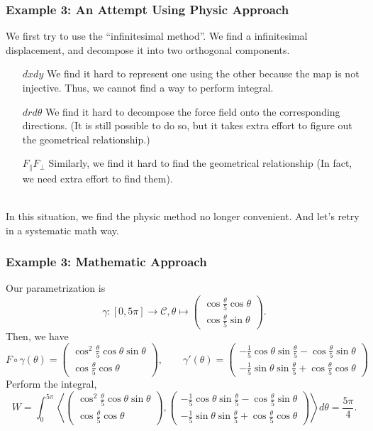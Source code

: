 \documentclass[11pt, t]{beamer}
\newcommand{\nullspace}{~\\[15pt]}
\begin{document}
\begin{frame}
    \frametitle{Example 3: An Attempt Using Physic Approach}
    We first try to use the ``infinitesimal method''. We find a infinitesimal displacement, and decompose it into two orthogonal components.  \nullspace
    \begin{itemize}
        \item[$dxdy$] We find it hard to represent one using the other because the map is not injective. Thus, we cannot  find a way to perform integral.
        \item[$drd\theta$] We find it hard to decompose the force field onto the corresponding directions. (It is still possible to do so, but it takes extra effort to figure out the geometrical relationship.)
        \item[$F_\parallel F_\perp$] Similarly, we find it hard to find the geometrical relationship (In fact, we need extra effort to find them).
    \end{itemize}
    \nullspace
    In this situation, we find the physic method no longer convenient. And let's retry in a systematic math way.
\end{frame}

\begin{frame}
    \frametitle{Example 3: Mathematic Approach}
    Our parametrization is
    $$\gamma:[0,5\pi]\to \mathcal{C},\theta\mapsto\begin{pmatrix}
            \cos\frac{\theta}{5}\cos\theta \\
            \cos\frac{\theta}{5}\sin\theta
        \end{pmatrix}.$$
    Then, we have
    $$F\circ\gamma(\theta)=\begin{pmatrix}
            \cos^2\frac{\theta}{5}\cos\theta\sin\theta \\
            \cos\frac{\theta}{5}\cos\theta
        \end{pmatrix},\qquad \gamma'(\theta)=\begin{pmatrix}
            -\frac{1}{5}\cos\theta\sin\frac{\theta}{5}-\cos\frac{\theta}{5}\sin\theta \\
            -\frac{1}{5}\sin\theta\sin\frac{\theta}{5}+\cos\frac{\theta}{5}\cos\theta
        \end{pmatrix}$$
    Perform the integral,
    $$W=\int_0^{5\pi}\left\langle\begin{pmatrix}
            \cos^2\frac{\theta}{5}\cos\theta\sin\theta \\
            \cos\frac{\theta}{5}\cos\theta
        \end{pmatrix},\begin{pmatrix}
            -\frac{1}{5}\cos\theta\sin\frac{\theta}{5}-\cos\frac{\theta}{5}\sin\theta \\
            -\frac{1}{5}\sin\theta\sin\frac{\theta}{5}+\cos\frac{\theta}{5}\cos\theta
        \end{pmatrix}\right\rangle d\theta=\dfrac{5\pi}{4}.$$

\end{frame}
\end{document}
